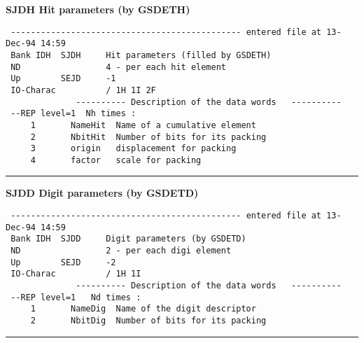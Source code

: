 {\large \bf \sf SJDH Hit parameters (by GSDETH)}
\begin{verbatim}
 ---------------------------------------------- entered file at 13-Dec-94 14:59
 Bank IDH  SJDH     Hit parameters (filled by GSDETH)                                  
 ND                 4 - per each hit element                                           
 Up        SEJD     -1                                                          
 IO-Charac          / 1H 1I 2F                                                  
              ---------- Description of the data words   ----------
 --REP level=1  Nh times :                                                        
     1       NameHit  Name of a cumulative element 
     2       NbitHit  Number of bits for its packing                            
     3       origin   displacement for packing
     4       factor   scale for packing
\end{verbatim}

\rule{15cm}{.05cm} 

{\large \bf \sf SJDD Digit parameters (by GSDETD)}
\begin{verbatim}
 ---------------------------------------------- entered file at 13-Dec-94 14:59
 Bank IDH  SJDD     Digit parameters (by GSDETD)                                
 ND                 2 - per each digi element                                          
 Up        SEJD     -2                                                          
 IO-Charac          / 1H 1I                                                     
              ---------- Description of the data words   ----------
 --REP level=1   Nd times :                                                         
     1       NameDig  Name of the digit descriptor                              
     2       NbitDig  Number of bits for its packing                            
\end{verbatim}

\rule{15cm}{.05cm} 

